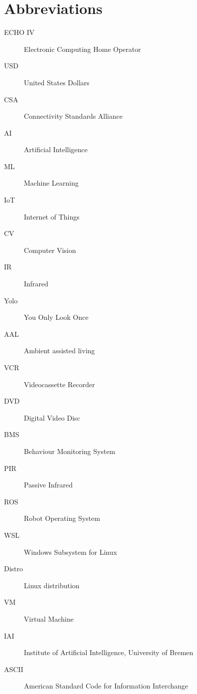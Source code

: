 \chapter*{Abbreviations}\label{abbr}
\begin{description}
\item[ECHO IV] Electronic Computing Home Operator
\item[USD] United States Dollars
\item[CSA] Connectivity Standards Alliance
\item[AI] Artificial Intelligence
\item[ML] Machine Learning 
\item[IoT] Internet of Things
\item[CV] Computer Vision
\item[IR] Infrared 
\item[Yolo] You Only Look Once
\item[AAL] Ambient assisted living
\item[VCR] Videocassette Recorder
\item[DVD] Digital Video Disc
\item[BMS] Behaviour Monitoring System
\item[PIR] Passive Infrared
\item[ROS] Robot Operating System
\item[WSL] Windows Subsystem for Linux
\item[Distro] Linux distribution
\item[VM] Virtual Machine
\item[IAI] Institute of Artificial Intelligence, University of Bremen
\item[ASCII] American Standard Code for Information Interchange
\end{description}
